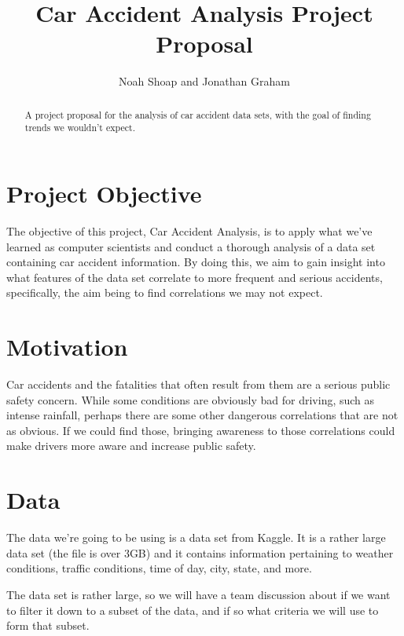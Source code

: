 \documentclass[letterpaper, 10 pt, conference]{ieeeconf}  %
\title{\LARGE \bf
Car Accident Analysis Project Proposal
}
\author{Noah Shoap and Jonathan Graham
}
\begin{document}
\maketitle
\thispagestyle{empty}
\pagestyle{empty}


\begin{abstract}

A project proposal for the analysis of car accident data sets, with the goal of finding trends we wouldn't expect.

\end{abstract}


\section{Project Objective}
The objective of this project, Car Accident Analysis, is to apply what we've learned as computer scientists and conduct a thorough analysis of a data set containing car accident information.  By doing this, we aim to gain insight into what features of the data set correlate to more frequent and serious accidents, specifically, the aim being to find correlations we may not expect.

\section{Motivation}

Car accidents and the fatalities that often result from them are a serious public safety concern.  While some conditions are obviously bad for driving, such as intense rainfall, perhaps there are some other dangerous correlations that are not as obvious.  If we could find those, bringing awareness to those correlations could make drivers more aware and increase public safety.

\section{Data}

The data we're going to be using is a data set from Kaggle.  It is a rather large data set (the file is over 3GB) and it contains information pertaining to weather conditions, traffic conditions, time of day, city, state, and more.  


The data set is rather large, so we will have a team discussion about if we want to filter it down to a subset of the data, and if so what criteria we will use to form that subset.
\end{document}
